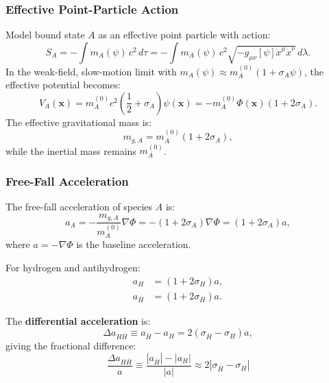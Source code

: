\subsubsection{Effective Point-Particle Action}

Model bound state $A$ as an effective point particle with action:
\begin{equation}
S_A = -\int m_A(\psi)\,c^2\,d\tau = -\int m_A(\psi)\,c^2\sqrt{-g_{\mu\nu}[\psi]\dot{x}^\mu\dot{x}^\nu}\,d\lambda.
\end{equation}
In the weak-field, slow-motion limit with $m_A(\psi) \approx m_A^{(0)}(1 + \sigma_A\psi)$, 
the effective potential becomes:
\begin{equation}
V_A(\mathbf{x}) = m_A^{(0)}c^2\left(\frac{1}{2} + \sigma_A\right)\psi(\mathbf{x}) 
= -m_A^{(0)}\Phi(\mathbf{x})(1 + 2\sigma_A).
\end{equation}
The effective gravitational mass is:
\begin{equation}
m_{g,A} = m_A^{(0)}(1 + 2\sigma_A),
\end{equation}
while the inertial mass remains $m_A^{(0)}$.

\subsubsection{Free-Fall Acceleration}

The free-fall acceleration of species $A$ is:
\begin{equation}
a_A = -\frac{m_{g,A}}{m_A^{(0)}}\nabla\Phi = -(1 + 2\sigma_A)\nabla\Phi = (1 + 2\sigma_A)a,
\label{eq:species-acceleration}
\end{equation}
where $a = -\nabla\Phi$ is the \GR baseline acceleration.

For hydrogen and antihydrogen:
\begin{align}
a_H &= (1 + 2\sigma_H)a, \\
a_{\bar{H}} &= (1 + 2\sigma_{\bar{H}})a.
\end{align}

The \textbf{differential acceleration} is:
\begin{equation}
\Delta a_{H\bar{H}} \equiv a_{\bar{H}} - a_H = 2(\sigma_{\bar{H}} - \sigma_H)a,
\end{equation}
giving the fractional difference:
\begin{equation}
\boxed{
\frac{\Delta a_{H\bar{H}}}{a} \equiv \frac{|a_{\bar{H}}| - |a_H|}{|a|} \approx 2|\sigma_{\bar{H}} - \sigma_H|
}
\label{eq:differential-acceleration}
\end{equation}


